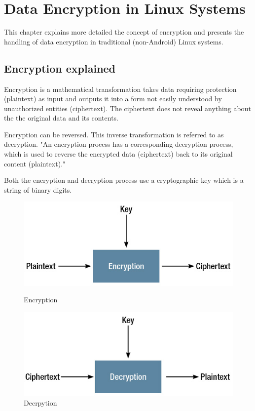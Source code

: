\chapter{Data Encryption in Linux Systems}
\label{chapter:enc-linux}

This chapter explains more detailed the concept of encryption and presents the handling of data encryption in traditional (non-Android) Linux systems.

\section{Encryption explained}
\label{sec:enc-explained}

Encryption is a mathematical transformation takes data requiring protection (plaintext) as input and outputs it into a form not easily understood by unauthorized entities (ciphertext). The ciphertext does not reveal anything about the the original data and its contents.

Encryption can be reversed. This inverse transformation is referred to as decryption. "An encryption process has a corresponding decryption process, which is used to reverse the encrypted data (ciphertext) back to its original content (plaintext)\cite{enc-basics}."

Both the encryption and decryption process use a cryptographic key which is a string of binary digits.

\begin{figure}[h]
\centering
\begin{minipage}{0.45\textwidth}
\centering
  \includegraphics[width=.9\linewidth]{src/img/encrypt/plain2cipher.jpg}
  \caption{Encryption\cite{enc-basics}}
  \label{fig:encrypt-fig}
\end{minipage}\hfill
\begin{minipage}{0.45\textwidth}
\centering
  \includegraphics[width=.9\linewidth]{src/img/encrypt/cipher2plain.jpg}
  \caption{Decrpytion\cite{enc-basics}}
  \label{fig:decrypt-fig}
\end{minipage}
\end{figure}

